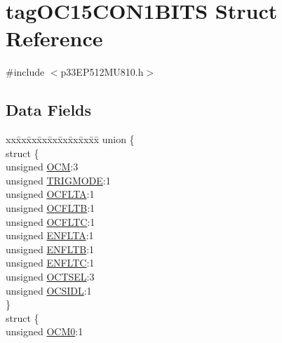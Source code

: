 \hypertarget{structtag_o_c15_c_o_n1_b_i_t_s}{}\section{tag\+O\+C15\+C\+O\+N1\+B\+I\+TS Struct Reference}
\label{structtag_o_c15_c_o_n1_b_i_t_s}


{\ttfamily \#include $<$p33\+E\+P512\+M\+U810.\+h$>$}

\subsection*{Data Fields}
\begin{DoxyCompactItemize}
\item 
\begin{tabbing}
xx\=xx\=xx\=xx\=xx\=xx\=xx\=xx\=xx\=\kill
union \{\\
\>struct \{\\
\>\>unsigned \hyperlink{structtag_o_c15_c_o_n1_b_i_t_s_a778fa0cf51a9477ac4e82d71a8733801}{OCM}:3\\
\>\>unsigned \hyperlink{structtag_o_c15_c_o_n1_b_i_t_s_a7a0057e0dca6e2663584b5b9e1da04c3}{TRIGMODE}:1\\
\>\>unsigned \hyperlink{structtag_o_c15_c_o_n1_b_i_t_s_acc967e41cecdeedc6ad4422f9ef1a6a3}{OCFLTA}:1\\
\>\>unsigned \hyperlink{structtag_o_c15_c_o_n1_b_i_t_s_a1fb30bb4421ef7c4bd0c66c379875593}{OCFLTB}:1\\
\>\>unsigned \hyperlink{structtag_o_c15_c_o_n1_b_i_t_s_a69a1772a4144abd579d17d28445b9934}{OCFLTC}:1\\
\>\>unsigned \hyperlink{structtag_o_c15_c_o_n1_b_i_t_s_a1e0f05fb23d516e003e4713fe8c1498a}{ENFLTA}:1\\
\>\>unsigned \hyperlink{structtag_o_c15_c_o_n1_b_i_t_s_a9d7aa97d5328b8b81ab7fd9145dfa0fc}{ENFLTB}:1\\
\>\>unsigned \hyperlink{structtag_o_c15_c_o_n1_b_i_t_s_a0b6f25c0f83f33b5501b6a2e6141a6ef}{ENFLTC}:1\\
\>\>unsigned \hyperlink{structtag_o_c15_c_o_n1_b_i_t_s_ae37d2a41dae2d2af1d82f7caae33cadb}{OCTSEL}:3\\
\>\>unsigned \hyperlink{structtag_o_c15_c_o_n1_b_i_t_s_afd05f4f249db4ef69b684e2f3fa6b703}{OCSIDL}:1\\
\>\} \\
\>struct \{\\
\>\>unsigned \hyperlink{structtag_o_c15_c_o_n1_b_i_t_s_a9271e84c9759ff10a7bc1cee3276e8f6}{OCM0}:1\\

\end{tabbing}
\end{DoxyCompactItemize}

